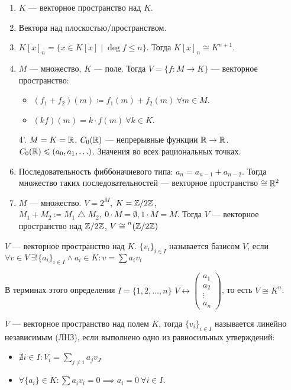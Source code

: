 \begin{example}
\slashn
\begin{enumerate}
    \item $K$ --- векторное пространство над $K$.
     \item Вектора над плоскостью/пространством.
     \item $K\left[x\right]_n = \{ x \in K[x] \mid \deg f \le n \}$. Тогда $K[x]_n \cong K^{n+1}$. 
     \item $M$ --- множество,  $K$ --- поле. Тогда  $V = \{ f\!: M \to K\}$ --- векторное пространство:
         \begin{itemize}
            \item $(f_1 + f_2)(m) \coloneqq f_1(m) + f_2(m)\ \forall m \in M$.
            \item $(kf)(m) = k \cdot f(m)\ \forall k \in K$.
         \end{itemize}
     \item[4'.] $M=K=\mathbb{R}$,  $C_0(\mathbb{R})$ --- непрерывные функции  $\mathbb{R} \to \mathbb{R}$.  $C_0(\mathbb{R}) \leqslant (a_0, a_1, \ldots)$. Значения во всех рациональных точках.
     \item Последовательность фиббоначиевого типа: $a_n = a_{n-1} + a_{n-2}$. Тогда множество таких последовательностей --- векторное пространство  $\cong \mathbb{R}^2$
     \item $M$ --- множество.  $V = 2^M$,  $K = \mathbb{Z} / 2 \mathbb{Z}$, $M_1 + M_2 \coloneqq M_1 \bigtriangleup M_2,\ 0 \cdot M = \emptyset, 1 \cdot M = M$. Тогда $V$ --- векторное пространство над  $\mathbb{Z} / 2 \mathbb{Z}$,  $V \cong \prescript{n}{}{(\Z / 2 \Z)}$
\end{enumerate}
\end{example}
\begin{definition}
    $V$ --- векторное пространство над  $K$.  $\{ v_i \}_{i \in I}$ называется базисом  $V$, если  $\forall v \in V\ \exists! \{a_i\}_{i \in I} \land a_i \in K\!: v = \sum a_i v_i$
\end{definition}
\begin{remark}
    В терминах этого определения $I = \{1, 2, \ldots, n\}$ $V \leftrightarrow \begin{pmatrix} a_1 \\ a_2 \\ \vdots \\ a_n \end{pmatrix}$, то есть $V \cong K^n$.
\end{remark}
\begin{definition}
    $V$ --- векторное пространство над полем  $K$, тогда  $\{v_i\}_{i \in I}$ называется линейно независимым (ЛНЗ), если выполнено одно из равносильных утверждений:
     \begin{itemize}
         \item $\nexists i \in I\!: V_i = \sum\limits_{j \neq i} a_jv_J$ 
         \item $\forall \{a_i\} \in K\!: \sum a_i v_i = 0 \implies a_i = 0\ \forall i \in I$.
    \end{itemize}
\end{definition}
